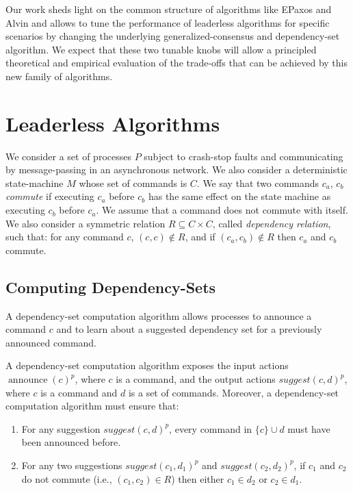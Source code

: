 Our work sheds light on the common structure of algorithms like EPaxos and Alvin and allows to tune the performance of leaderless algorithms for specific scenarios by changing the underlying generalized-consensus and dependency-set algorithm. 
We expect that these two tunable knobs will allow a principled theoretical and empirical evaluation of the trade-offs that can be achieved by this new family of algorithms.

\section{Leaderless Algorithms}

We consider a set of processes $P$ subject to crash-stop faults and communicating by message-passing in an asynchronous network.
We also consider a deterministic state-machine $M$ whose set of commands is $C$. 
We say that two commands $c_a$, $c_b$ \textit{commute} if executing $c_a$ before $c_b$ has the same effect on the state machine as executing $c_b$ before $c_a$. We assume that a command does not commute with itself.
We also consider a symmetric relation $R \subseteq C\times C$, called \textit{dependency relation}, such that: for any command $c$, $\left( c,c \right)\notin R$, and if $\left( c_a,c_b \right)\notin R$ then $c_a$ and $c_b$ commute. 




\subsection{Computing Dependency-Sets}

A dependency-set computation algorithm allows processes to announce a command $c$ and to learn about a suggested dependency set for a previously announced command.

A dependency-set computation algorithm exposes the input actions ${\operatorname{announce}\left( c \right)}^p$, where $c$ is a command, and the output actions ${suggest\left( c, d \right)}^p$, where $c$ is a command and $d$ is a set of commands.
Moreover, a dependency-set computation algorithm must ensure that:
\begin{enumerate}
    \item For any suggestion ${suggest\left( c, d \right)}^p$, every command in $\{c\}\cup d$ must have been announced before.
    \item For any two suggestions ${suggest\left( c_1, d_1 \right)}^p$ and ${suggest\left( c_2, d_2 \right)}^p$,  if $c_1$ and $c_2$ do not commute (i.e., $\left( c_1,c_2 \right) \in R$) then either $c_1\in d_2$ or $c_2 \in d_1$.
\end{enumerate}

